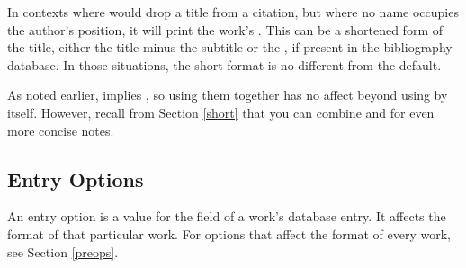 \documentclass[11pt,letterpaper,oneside]{article}
\begin{document}
\begin{optionlist}
In contexts where  would drop a title from a citation, but
where no name occupies the author's position, it will print the work's
. This can be a shortened form of the title,
either the title minus the subtitle or the , if
present in the bibliography database. In those situations, the short
format is no different from the default.

As noted earlier,  implies , so using them
together has no affect beyond using  by itself. However,
recall from Section \ref{short} that you can combine  and
 for even more concise notes.

\end{optionlist}

\subsection{Entry Options}
\label{entryops}

An entry option is a value for the  field of a
work's database entry. It affects the format of that particular work.
For options that affect the format of every work, see Section
\ref{preops}.
\end{document}
